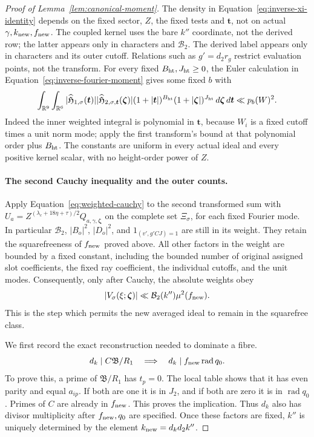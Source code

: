 \documentclass[12pt]{article}
\begin{document}
\begin{proof}[Proof of Lemma~\ref{lem:canonical-moment}]
The density in Equation~\eqref{eq:inverse-xi-identity} depends on the
fixed sector, \(Z\), the fixed tests and \(\boldsymbol t\), not on
actual \(\gamma,k_{\rm new},f_{\rm new}\).  The coupled kernel uses
the bare \(k''\) coordinate, not the derived row; the latter appears
only in characters and \(\mathcal B_2\).  The derived label appears
only in characters and its outer cutoff.  Relations such as
\(g'=d_2r_g\) restrict evaluation points, not the transform.
For every fixed \(B_{\rm ht},J_{\rm ht}\ge0\), the Euler calculation
in Equation~\eqref{eq:inverse-fourier-moment} gives some fixed \(b\) with
\begin{equation}\label{eq:inverse-joint-fourier-moments}
 \int_{\mathbb R^9}\int_{\mathbb R^6}
 |\widehat{\mathfrak H}_{1,\sigma}(\boldsymbol t)|
 |\widehat{\mathfrak H}_{2,\sigma,\boldsymbol t}(\boldsymbol\zeta)|
 (1+|\boldsymbol t|)^{B_{\rm ht}}(1+|\boldsymbol\zeta|)^{J_{\rm ht}}
 \,d\boldsymbol\zeta\,d\boldsymbol t\ll p_b(W)^2.
\end{equation}
Indeed the inner weighted integral is polynomial in \(\boldsymbol t\),
because \(W_i\) is a fixed cutoff times a unit norm mode; apply the
first transform's bound at that polynomial order plus \(B_{\rm ht}\).
The constants are uniform in every actual ideal and every positive
kernel scalar, with no height-order power of \(Z\).

\paragraph{The second Cauchy inequality and the outer counts.}
Apply Equation~\eqref{eq:weighted-cauchy} to the second transformed
sum with
\(U_a=Z^{(\lambda_c+18\eta+\tau)/2}Q_{a,\gamma,\boldsymbol\zeta}\)
on the complete set \(\Xi_\sigma\), for each fixed Fourier mode.
In particular \(\mathcal B_2\), \(|B_o|^2\), \(|D_o|^2\), and
\(1_{(v',g'CJ)=1}\) are still in its weight. They retain the
squarefreeness of \(f_{\rm new}\) proved above. All other factors in
the weight are bounded by a fixed constant,
including the bounded number of original assigned slot coefficients,
the fixed ray coefficient, the individual cutoffs, and the unit modes.
Consequently, only after Cauchy, the absolute weights obey
\[
 |V_\sigma(\xi;\boldsymbol\zeta)|
 \ll \mathcal B_2(k'')\mu^2(f_{\rm new}).
\]
This is the step which permits the new averaged ideal to remain in
the squarefree class.

We first record the exact reconstruction needed to dominate a fibre.
\begin{equation}\label{eq:poisson-divisor-reconstruction}
 d_k\mid C\mathfrak B/R_1
 \quad\Longrightarrow\quad
 d_k\mid f_{\rm new}\operatorname{rad}q_0.
\end{equation}
To prove this, a prime of \(\mathfrak B/R_1\) has \(t_p=0\).
The local table shows that it has even parity and equal \(a_{ip}\).
If both are one it is in \(J_2\), and if both are zero it is in
\(\operatorname{rad}q_0\).  Primes of \(C\) are already in
\(f_{\rm new}\).  This proves the implication.  Thus \(d_k\) also
has divisor multiplicity after \(f_{\rm new},q_0\) are specified.
Once these factors are fixed, \(k''\) is uniquely determined by
the element \(k_{\rm new}=d_kd_2k''\).


\end{proof}
\end{document}
